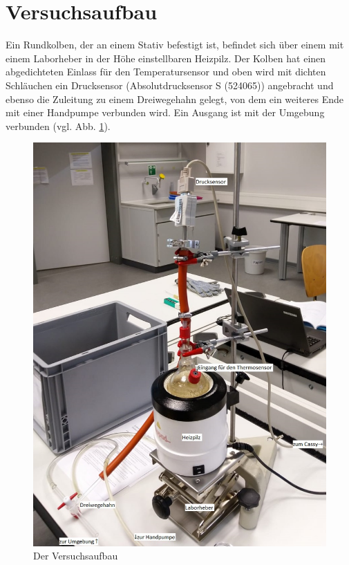\documentclass[]{article}
\begin{document}
	\section{Versuchsaufbau}
	Ein Rundkolben, der an einem Stativ befestigt ist, befindet sich über einem mit einem Laborheber in der Höhe einstellbaren Heizpilz. Der Kolben hat einen abgedichteten Einlass für den Temperatursensor und oben wird mit dichten Schläuchen ein Drucksensor (Absolutdrucksensor S (524065)) angebracht und ebenso die Zuleitung zu einem Dreiwegehahn gelegt, von dem ein weiteres Ende mit einer Handpumpe verbunden wird. Ein Ausgang ist mit der Umgebung verbunden (vgl. Abb. \ref{Aufbau}).
	\begin{figure}
		\begin{center}
			\includegraphics[scale=0.85]{Images/Aufbau.jpg}
			\caption{Der Versuchsaufbau}
			\label{Aufbau}
		\end{center}
	\end{figure}
\end{document}
